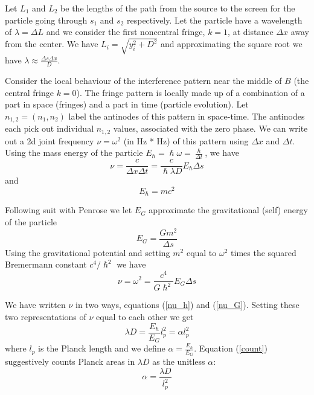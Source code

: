 \documentclass[12pt,a4paper]{article}
\begin{document}
Let $L_1$ and $L_2$ be the lengths of the path from the source to the screen for the particle going through $s_1$ and $s_2$ respectively. Let the particle have a wavelength of $\lambda = \Delta L$ and we consider the first noncentral fringe, $k=1$, at distance $\Delta x$ away from the center.  We have $L_i = \sqrt{y_i^2 + D^2}$ and approximating the square root we have $\lambda \approx \frac{\Delta s \Delta x}{D}$.

Consider the local behaviour of the interference pattern near the middle of $B$ (the central fringe $k=0$). The fringe pattern is locally made up of a combination of a part in space (fringes) and a part in time (particle evolution). Let $n_{1,2} = (n_1, n_2)$ label the antinodes of this pattern in space-time. The antinodes each pick out individual $n_{1,2}$ values, associated with the zero phase. We can write out a 2d joint frequency $\nu = \omega^2$ (in Hz * Hz) of this pattern using $\Delta x$ and $\Delta t$.  Using the mass energy of the particle $E_\hslash = \hslash \omega = \frac{\hslash}{\Delta t}$, we have
\begin{equation}
\label{nu_h}
  \nu = \frac{c}{\Delta x \Delta t} = \frac{c}{\hslash \lambda D} E_\hslash \Delta{s}
\end{equation}
and
\begin{equation}
\label{def_h}
E_\hslash = m c^2
\end{equation}


Following suit with Penrose\cite{penrose} we let $E_G$ approximate the gravitational (self) energy of the particle 
\begin{equation}
\label{def_G}
E_G = \frac{G m^2}{\Delta s}
\end{equation}
Using the gravitational potential and setting $m^2$  equal to $\omega^2$ times the squared Bremermann constant $c^4/\hslash^2$ we have
\begin{equation}
\label{nu_G}
\nu = \omega^2 = \frac{c^4}{G \hslash^2} E_G \Delta s
\end{equation}


We have written $\nu$ in two ways, equations (\ref{nu_h}) and (\ref{nu_G}). Setting these two representations of $\nu$ equal to each other we get
\begin{equation}
\label{count}
\lambda D = \frac{E_\hslash}{E_G} l_p^2 = \alpha l_p^2
\end{equation}
where $l_p$ is the Planck length and we define $\alpha = \frac{E_\hslash}{E_G}$. Equation (\ref{count}) suggestively counts Planck areas in $\lambda D$ as the unitless $\alpha$:
\begin{equation}
\label{count2}
   \alpha = \frac{\lambda D}{l_p^2}
\end{equation}
\end{document}
